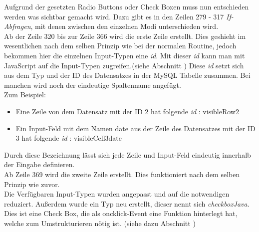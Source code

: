 Aufgrund der gesetzten Radio Buttons oder Check Boxen muss nun entschieden werden was sichtbar gemacht wird. Dazu gibt es in den Zeilen 279 - 317 \textit{If-Abfragen}, mit denen zwischen den einzelnen Modi unterschieden wird.\\  
Ab der Zeile 320 bis zur Zeile 366 wird die erste Zeile erstellt. Dies geshieht im wesentlichen nach dem selben Prinzip wie bei der normalen Routine, jedoch bekommen hier die einzelnen Input-Typen eine \textit{id}. Mit dieser \textit{id} kann man mit JavaScript auf die Input-Typen zugreifen.(siehe Abschnitt ) Diese \textit{id} setzt sich aus dem Typ und der ID des Datensatzes in der MySQL Tabelle zusammen. Bei manchen wird noch der eindeutige Spaltenname angefügt.\\
Zum Beispiel:
\begin{itemize}
	\item Eine Zeile von dem Datensatz mit der ID 2 hat folgende \textit{id} : visibleRow2
	\item Ein Input-Feld mit dem Namen date aus der Zeile des Datensatzes mit der ID 3 hat folgende \textit{id} : visibleCell3date
\end{itemize}
Durch diese Bezeichnung lässt sich jede Zeile und Input-Feld eindeutig innerhalb der Eingabe definieren.\\
Ab Zeile 369 wird die zweite Zeile erstellt. Dies funktioniert nach dem selben Prinzip wie zuvor.\\
Die Verfügbaren Input-Typen wurden angepasst und auf die notwendigen reduziert. Außerdem wurde ein Typ neu erstellt, dieser nennt sich \textit{checkboxJava}. Dies ist eine Check Box, die als oncklick-Event eine Funktion hinterlegt hat, welche zum Umstrukturieren nötig ist. (siehe dazu Abschnitt )

